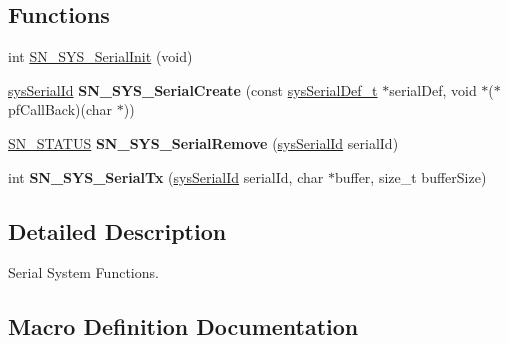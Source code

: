 \subsection*{Functions}
\begin{DoxyCompactItemize}
\item 
int \hyperlink{group__SYSTEM__SERIAL__COMM_ga5945cfb2c1d87d3fa9ad40bf928bd05a}{S\+N\+\_\+\+S\+Y\+S\+\_\+\+Serial\+Init} (void)
\item 
\mbox{\label{group__SYSTEM__SERIAL__COMM_gaca93cc653a4c4657a762050b4228db3e}} 
\hyperlink{structsys__serial__id}{sys\+Serial\+Id} {\bfseries S\+N\+\_\+\+S\+Y\+S\+\_\+\+Serial\+Create} (const \hyperlink{structsys__serial__def}{sys\+Serial\+Def\+\_\+t} $\ast$serial\+Def, void $\ast$($\ast$pf\+Call\+Back)(char $\ast$))
\item 
\mbox{\label{group__SYSTEM__SERIAL__COMM_ga8644661ec9dba59ae309766a0b29c741}} 
\hyperlink{group__SYSTEM__ERROR_ga4540713b9a7a18ce44d78c3a10f7442f}{S\+N\+\_\+\+S\+T\+A\+T\+US} {\bfseries S\+N\+\_\+\+S\+Y\+S\+\_\+\+Serial\+Remove} (\hyperlink{structsys__serial__id}{sys\+Serial\+Id} serial\+Id)
\item 
\mbox{\label{group__SYSTEM__SERIAL__COMM_gad0b162a078bef55b327436140da0650c}} 
int {\bfseries S\+N\+\_\+\+S\+Y\+S\+\_\+\+Serial\+Tx} (\hyperlink{structsys__serial__id}{sys\+Serial\+Id} serial\+Id, char $\ast$buffer, size\+\_\+t buffer\+Size)
\end{DoxyCompactItemize}


\subsection{Detailed Description}
Serial System Functions. 



\subsection{Macro Definition Documentation}
\mbox{\label{group__SYSTEM__SERIAL__COMM_ga3b81478c7058ceb6ed610ce8e2ca3822}} 
